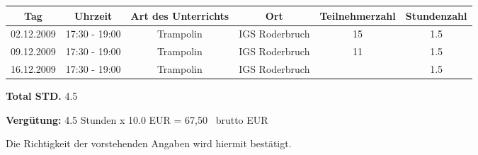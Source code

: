 \documentclass[a4paper,10pt,BCOR=0mm]{scrreprt}
\begin{document}
\begin{flushright}
\begin{tabular}{|c|c|c|c|c|c|}\hline
 \textbf{Tag}
&
 \textbf{Uhrzeit}
&
 \textbf{Art des Unterrichts}
&
\textbf{Ort}
&
\textbf{Teilnehmerzahl}
&
 \textbf{Stundenzahl}\\\hline\hline

02.12.2009
&
17:30 - 19:00
&
Trampolin
&
IGS Roderbruch
&
15
&
1.5
\\\hline


09.12.2009
&
17:30 - 19:00
&
Trampolin
&
IGS Roderbruch
&
11
&
1.5
\\\hline


16.12.2009
&
17:30 - 19:00
&
Trampolin
&
IGS Roderbruch
&

&
1.5
\\\hline



\end{tabular} 
\begin{flushright}
\parbox{5cm}{\textbf{Total STD.} 4.5}\end{flushright}
\hfill\hfill \textbf{Vergütung:} 4.5 Stunden x 10.0 EUR = 67,50 \officialeuro\  brutto EUR \hspace*{2cm}\\
\end{flushright}
\vfill
Die Richtigkeit der vorstehenden Angaben wird hiermit bestätigt.\\
\end{document}
